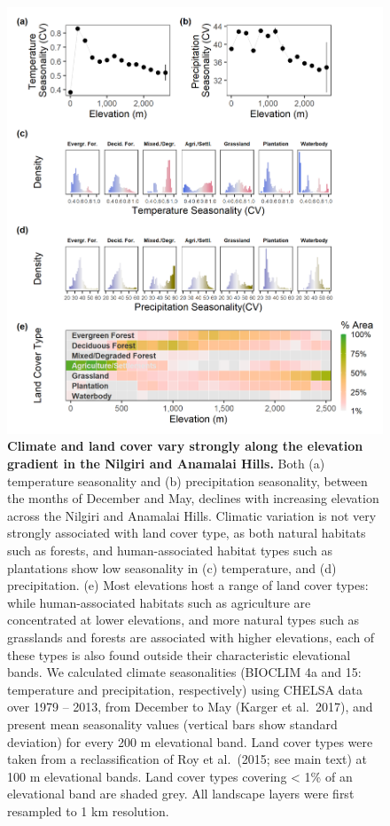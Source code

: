 \documentclass[
]{article}
\begin{document}
\begin{figure}
\centering
\includegraphics{figs/fig_02.png}
\caption{\textbf{Climate and land cover vary strongly along the elevation gradient in the Nilgiri and Anamalai Hills.}
Both (a) temperature seasonality and (b) precipitation seasonality, between the months of December and May, declines with increasing elevation across the Nilgiri and Anamalai Hills. Climatic variation is not very strongly associated with land cover type, as both natural habitats such as forests, and human-associated habitat types such as plantations show low seasonality in (c) temperature, and (d) precipitation. (e) Most elevations host a range of land cover types: while human-associated habitats such as agriculture are concentrated at lower elevations, and more natural types such as grasslands and forests are associated with higher elevations, each of these types is also found outside their characteristic elevational bands. We calculated climate seasonalities (BIOCLIM 4a and 15: temperature and precipitation, respectively) using CHELSA data over 1979 -- 2013, from December to May (Karger et al.~2017), and present mean seasonality values (vertical bars show standard deviation) for every 200 m elevational band. Land cover types were taken from a reclassification of Roy et al.~(2015; see main text) at 100 m elevational bands. Land cover types covering \textless{} 1\% of an elevational band are shaded grey. All landscape layers were first resampled to 1 km resolution.}
\end{figure}
\end{document}
